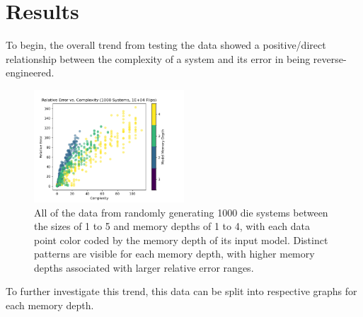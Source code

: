 \documentclass[12pt]{article}
\begin{document}
\section{Results}
To begin, the overall trend from testing the data showed a positive/direct relationship between the complexity of a system and its error in being reverse-engineered. 

\begin{figure}[H]
    \centering
    \includegraphics[width=0.5\textwidth]{images/graph-all.png}
    \caption{All of the data from randomly generating 1000 die systems between the sizes of 1 to 5 and memory depths of 1 to 4, with each data point color coded by the memory depth of its input model. Distinct patterns are visible for each memory depth, with higher memory depths associated with larger relative error ranges. }
    \label{fig:all-data}
\end{figure}

To further investigate this trend, this data can be split into respective graphs for each memory depth.
\end{document}

